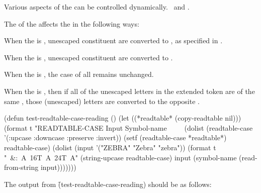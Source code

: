 

Various aspects of the  can be controlled dynamically.
\Seesection\Readtables\ and \secref\ReaderVars.

\endsubsection%
 

The  of the  affects the 
in the following ways:

\beginlist
{}

 When the  is ,
 unescaped constituent  are converted to ,
 as specified in \secref\ReaderAlgorithm.


 When the  is ,
 unescaped constituent  are converted to .


When the  is ,
 the case of all  remains unchanged.


When the  is ,
 then if all of the unescaped letters in the extended token are of the same , 
 those (unescaped) letters are converted to the opposite .

\endlist


\code
 (defun test-readtable-case-reading ()
   (let ((*readtable* (copy-readtable nil)))
     (format t "READTABLE-CASE  Input   Symbol-name~
              ~%
              ~%
     (dolist (readtable-case '(:upcase :downcase :preserve :invert))
       (setf (readtable-case *readtable*) readtable-case)
       (dolist (input '("ZEBRA" "Zebra" "zebra"))
         (format t "~&:~A~16T~A~24T~A"
                 (string-upcase readtable-case)
                 input
                 (symbol-name (read-from-string input)))))))
\endcode
 
The output from \f{(test-readtable-case-reading)} should be as follows:

